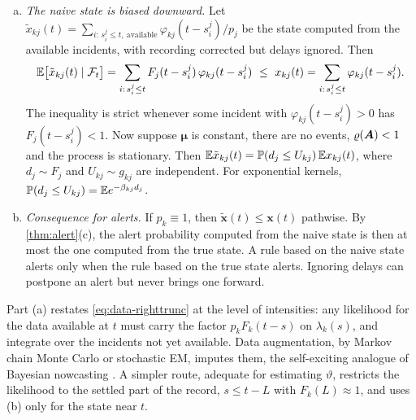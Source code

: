 \begin{proposition}
\begin{enumerate}[(a)]
  For exponential kernels the same holds for the state. Let $\hat{\bm x}(t)$ be
  obtained by computing the state at $t-\delta$ with the weights of \eqref{eq:fc-ht}
  and propagating it to $t$ with the mean dynamics of \cref{prop:irf}(c). Then
  $\hat{\bm x}(t)$ is conditionally unbiased for $\E[\bm x(t)\mid\Hist_{t-\delta}]$.
  If every $F_j(0)>0$, one can take $\delta=0$. In that case $\hat{\bm h}$ is the
  Horvitz--Thompson estimator of $\bm h_t$, and it is conditionally unbiased given the
  complete history $\Hist_t$.
  \item \emph{The naive state is biased downward.} Let
  $\tilde x_{kj}(t)=\sum_{i:\,s^j_i\le t,\ \text{available}}\varphi_{kj}(t-s^j_i)/p_j$ be
  the state computed from the available incidents, with recording corrected but delays
  ignored. Then
  \begin{equation}\label{eq:fc-naive}
    \mathbb{E}\bigl[\tilde x_{kj}(t)\mid\mathcal{F}_t\bigr]
    =\sum_{i:\,s^j_i\le t}F_j(t-s^j_i)\,\varphi_{kj}(t-s^j_i)
    \ \le\ x_{kj}(t)=\sum_{i:\,s^j_i\le t}\varphi_{kj}(t-s^j_i).
  \end{equation}
  The inequality is strict whenever some incident with $\varphi_{kj}(t-s^j_i)>0$ has
  $F_j(t-s^j_i)<1$. Now suppose $\bm\mu$ is constant, there are no events,
  $\varrho(\bm{A})<1$ and the process is stationary. Then
  $\mathbb{E}\tilde x_{kj}(t)=\mathbb{P}(d_j\le U_{kj})\,\mathbb{E} x_{kj}(t)$, where $d_j\sim F_j$ and
  $U_{kj}\sim g_{kj}$ are independent. For exponential kernels,
  $\mathbb{P}(d_j\le U_{kj})=\mathbb{E} e^{-\beta_{kj}d_j}$.
  \item \emph{Consequence for alerts.} If $p_k\equiv1$, then
  $\tilde{\bm x}(t)\le\bm x(t)$ pathwise. By \cref{thm:alert}(c), the alert probability
  computed from the naive state is then at most the one computed from the true state. A
  rule based on the naive state alerts only when the rule based on the true state
  alerts. Ignoring delays can postpone an alert but never brings one forward.
\end{enumerate}
\end{proposition}

Part (a) restates \eqref{eq:data-righttrunc} at the level of intensities: any likelihood
for the data available at $t$ must carry the factor $p_kF_k(t-s)$ on $\lambda_k(s)$, and
integrate over the incidents not yet available. Data augmentation, by Markov chain Monte
Carlo or stochastic EM, imputes them, the self-exciting analogue of Bayesian nowcasting
\citep{hohle2014,mcgough2020}. A simpler route, adequate for estimating $\vartheta$,
restricts the likelihood to the settled part of the record, $s\le t-L$ with
$F_k(L)\approx1$, and uses (b) only for the state near $t$.

